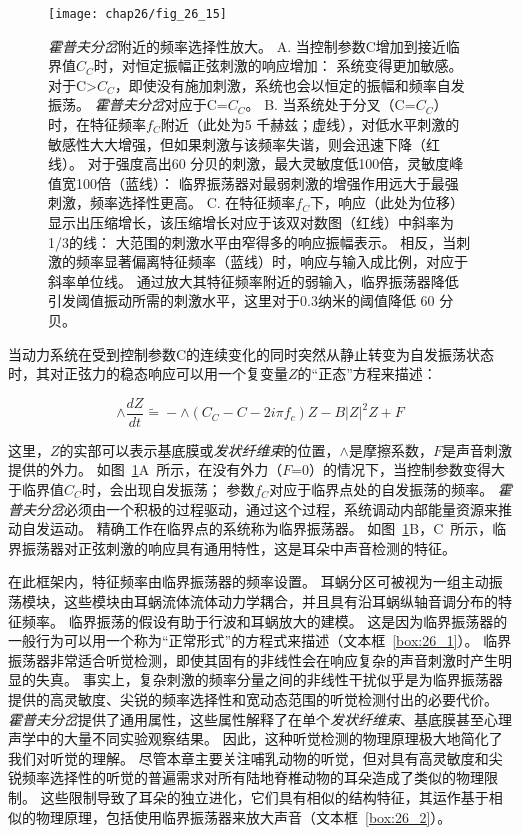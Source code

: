 \begin{figure}[htbp]
	\centering
	\texttt{[image: chap26/fig\_26\_15]}
	\caption{\textit{霍普夫分岔}附近的频率选择性放大。
		A. 当控制参数C增加到接近临界值$C_C$时，对恒定振幅正弦刺激的响应增加：
		系统变得更加敏感。
		对于C>$C_C$，即使没有施加刺激，系统也会以恒定的振幅和频率自发振荡。
		\textit{霍普夫分岔}对应于C=$C_C$。
		B. 当系统处于分叉（C=$C_C$）时，在特征频率$f_C$附近（此处为5 千赫兹；虚线），对低水平刺激的敏感性大大增强，但如果刺激与该频率失谐，则会迅速下降（红线）。
		对于强度高出60 分贝的刺激，最大灵敏度低100倍，灵敏度峰值宽100倍（蓝线）：
		临界振荡器对最弱刺激的增强作用远大于最强刺激，频率选择性更高。
		C. 在特征频率$f_C$下，响应（此处为位移）显示出压缩增长，该压缩增长对应于该双对数图（红线）中斜率为1/3的线：
		大范围的刺激水平由窄得多的响应振幅表示。
		相反，当刺激的频率显著偏离特征频率（蓝线）时，响应与输入成比例，对应于斜率单位线。
		通过放大其特征频率附近的弱输入，临界振荡器降低引发阈值振动所需的刺激水平，这里对于0.3纳米的阈值降低 60 分贝。}
	\label{fig:26_15}
\end{figure}


\begin{proposition} \label{box:26_1}
	
	\quad \quad 当动力系统在受到控制参数C的连续变化的同时突然从静止转变为自发振荡状态时，其对正弦力的稳态响应可以用一个复变量$Z$的“正态”方程来描述：
	
	\begin{equation}\label{sound_pressure}
		\wedge \frac{dZ}{dt} \tilde{=} 
		- \wedge (C_C - C - 2 i \pi f_c) Z - 
		B |Z|^2 Z + F
	\end{equation}
	
	\quad \quad 这里，$Z$的实部可以表示基底膜或\textit{发状纤维束}的位置，$\wedge$是摩擦系数，$F$是声音刺激提供的外力。
	如图~\ref{fig:26_15}A~所示，在没有外力（$F$=0）的情况下，当控制参数变得大于临界值$C_C$时，会出现自发振荡；
	参数$f_C$对应于临界点处的自发振荡的频率。
	\textit{霍普夫分岔}必须由一个积极的过程驱动，通过这个过程，系统调动内部能量资源来推动自发运动。
	精确工作在临界点的系统称为临界振荡器。
	如图~\ref{fig:26_15}B，C~所示，临界振荡器对正弦刺激的响应具有通用特性，这是耳朵中声音检测的特征。
	
\end{proposition}


在此框架内，特征频率由临界振荡器的频率设置。
耳蜗分区可被视为一组主动振荡模块，这些模块由耳蜗流体流体动力学耦合，并且具有沿耳蜗纵轴音调分布的特征频率。
临界振荡的假设有助于行波和耳蜗放大的建模。
这是因为临界振荡器的一般行为可以用一个称为“正常形式”的方程式来描述（文本框~\ref{box:26_1}）。
临界振荡器非常适合听觉检测，即使其固有的非线性会在响应复杂的声音刺激时产生明显的失真。
事实上，复杂刺激的频率分量之间的非线性干扰似乎是为临界振荡器提供的高灵敏度、尖锐的频率选择性和宽动态范围的听觉检测付出的必要代价。
\textit{霍普夫分岔}提供了通用属性，这些属性解释了在单个\textit{发状纤维束}、基底膜甚至心理声学中的大量不同实验观察结果。
因此，这种听觉检测的物理原理极大地简化了我们对听觉的理解。
尽管本章主要关注哺乳动物的听觉，但对具有高灵敏度和尖锐频率选择性的听觉的普遍需求对所有陆地脊椎动物的耳朵造成了类似的物理限制。
这些限制导致了耳朵的独立进化，它们具有相似的结构特征，其运作基于相似的物理原理，包括使用临界振荡器来放大声音（文本框~\ref{box:26_2}）。


